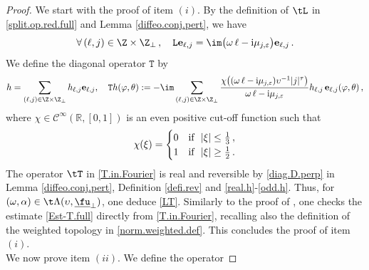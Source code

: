 \documentclass[a4paper,reqno,10pt]{article}
\newcommand{\ii }{{\rm i} }
\begin{document}
\begin{proof}
We start with the proof of item $(i)$.
By the definition of $\tL$ in \eqref{split.op.red.full} and Lemma \ref{diffeo.conj.pert}, we have
\begin{equation}
 \forall\, (\ell,j)\in \Z \times \Z_{\perp}\,, \quad  \mathtt{L}{\bf e}_{\ell,j}=
 \im\big(\omega\,\ell-\ii\mu_{j,\varepsilon}\big) {\bf e}_{\ell,j} \,.
\end{equation}
We define the diagonal  operator  $\mathtt{T}$ by 
\begin{equation}\label{T.in.Fourier}
h=\sum_{(\ell,j)\in \Z \times \Z_{\perp}}h_{\ell,j}{\bf e}_{\ell,j},\quad\mathtt{T} h(\varphi,\theta) :=
-\im \sum_{ (\ell,j)\in \Z \times \Z_{\perp}}\frac{\chi\big((\omega\,\ell-\ii\mu_{j,\varepsilon})\upsilon^{-1}| j|^{\tau}\big)}{\omega\,\ell-\ii\mu_{j,\varepsilon}}h_{\ell,j}\,{\bf e}_{\ell,j}(\varphi,\theta)\,,
\end{equation}
where $\chi\in\mathscr{C}^\infty(\mathbb{R},[0,1])$ is an even positive cut-off function  such that 
\begin{equation}\label{properties cut-off function first reduction} 
   \chi(\xi) = \begin{cases}
        0 & \textnormal{if } \ |\xi|\leq \frac13 \,, \\
        1 & \textnormal{if } \ |\xi|\geq \frac12 \,.
    \end{cases}
\end{equation}
The operator $\tT$ in \eqref{T.in.Fourier} is real and reversible by \eqref{diag.D.perp} in Lemma \ref{diffeo.conj.pert}, Definition \ref{defi.rev} and \eqref{real.h}-\eqref{odd.h}.
Thus, for $(\omega,\alpha)\in\t\Lambda(\upsilon,\underline{\fu}_{\perp})$, one deduce \eqref{LT}.
Similarly to the proof of \cite[Theorem 9.1-(i)]{HHM21}, one   checks the estimate \eqref{Est-T.full}  directly from \eqref{T.in.Fourier}, recalling also the definition of the weighted topology in  \eqref{norm.weighted.def}.
This concludes the proof of item $(i)$.
\\[1mm]
\noindent We now prove item $(ii)$.
We define the operator

\end{proof}
\end{document}
